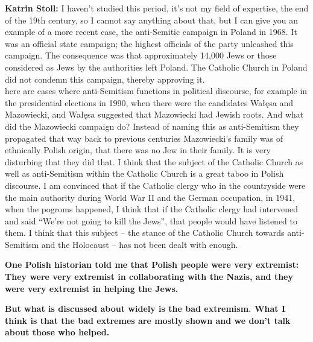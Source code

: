 \textbf{Katrin Stoll:} I haven’t studied this period, it’s not my field of expertise, the end of the 19th century, so I cannot say anything about that, but I can give you an example of a more recent case, the anti-Semitic campaign in Poland in 1968. It was an official state campaign; the highest officials of the party unleashed this campaign. The consequence was that approximately 14,000 Jews or those considered as Jews by the authorities left Poland. The Catholic Church in Poland did not condemn this campaign, thereby approving it.\\ 
here are cases where anti-Semitism functions in political discourse, for example in the presidential elections in 1990, when there were the candidates Wałęsa and Mazowiecki, and Wałęsa suggested that Mazowiecki had Jewish roots. And what did the Mazowiecki campaign do? Instead of naming this as anti-Semitism they propagated that way back to previous centuries Mazowiecki’s family was of ethnically Polish origin, that there was no Jew in their family. It is very disturbing that they did that. I think that the subject of the Catholic Church as well as anti-Semitism within the Catholic Church is a great taboo in Polish discourse. I am convinced that if the Catholic clergy who in the countryside were the main authority during World War II and the German occupation, in 1941, when the pogroms happened, I think that if the Catholic clergy had intervened and said ``We're not going to kill the Jews'', that people would have listened to them. I think that this subject – the stance of the Catholic Church towards anti-Semitism and the Holocaust – has not been dealt with enough. 





\textbf{One Polish historian told me that Polish people were very extremist: They were very extremist in collaborating with the Nazis, and they were very extremist in helping the Jews.}\par 
\textbf{But what is discussed about widely is the bad extremism. What I think is that the bad extremes are mostly shown and we don’t talk about those who helped.}

